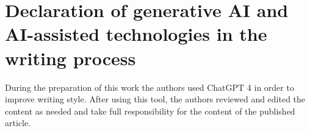 \documentclass[final,3p,times,review]{elsarticle}
\begin{document}
\section*{Declaration of generative AI and AI-assisted technologies in the writing process}

During the preparation of this work the authors used ChatGPT 4 in order to improve writing style. After using this tool, the authors reviewed and edited the content as needed and take full responsibility for the content of the published article.

  
 





\end{document}
